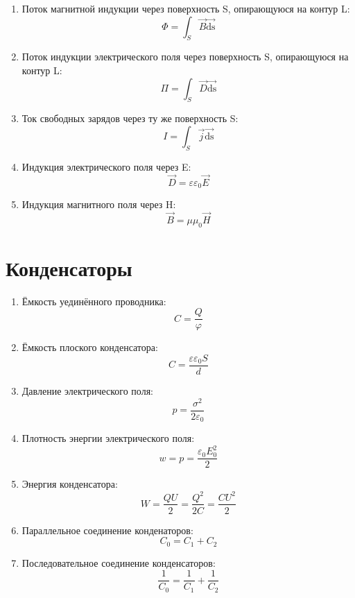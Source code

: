 \begin{enumerate}
\begin{enumerate}
				\end{enumerate}
			\item Поток магнитной индукции через поверхность S, опирающуюся на контур L: \[ \Phi =  \int_S \overrightarrow{B} \overrightarrow{\mathrm{ds}}\]
			\item Поток индукции электрического поля через поверхность S, опирающуюся на контур L: \[ \Pi = \int_S \overrightarrow{D} \overrightarrow{\mathrm{ds}} \]
			\item Ток свободных зарядов через ту же поверхность S: \[ I = \int_S \overrightarrow{j} \overrightarrow{\mathrm{ds}}\]
			\item Индукция электрического поля через E: \[ \overrightarrow{D} = \varepsilon \varepsilon_0 \overrightarrow{E}\]
			\item Индукция магнитного поля через H: \[ \overrightarrow{B} = \mu \mu_0 \overrightarrow{H} \]
		\end{enumerate}
		
	\section{Конденсаторы}
		\begin{enumerate}
			\item Ёмкость уединённого проводника: \[ C = \frac{Q}{\varphi}\]
			\item Ёмкость плоского конденсатора: \[ C = \frac{\varepsilon \varepsilon_0 S}{d} \]
			\item Давление электрического поля: \[ p = \frac{\sigma^2}{2 \varepsilon_0} \]
			\item Плотность энергии электрического поля: \[ w = p = \frac{\varepsilon_0 E_0^2}{2} \]
			\item Энергия конденсатора: \[ W = \frac{QU}{2} = \frac{Q^2}{2C} = \frac{CU^2}{2} \]
			\item Параллельное соединение конденаторов: \[ C_0 = C_1 + C_2 \]
			\item Последовательное соединение конденсаторов: \[ \frac{1}{C_0} = \frac{1}{C_1} + \frac{1}{C_2} \]
		\end{enumerate}
	
